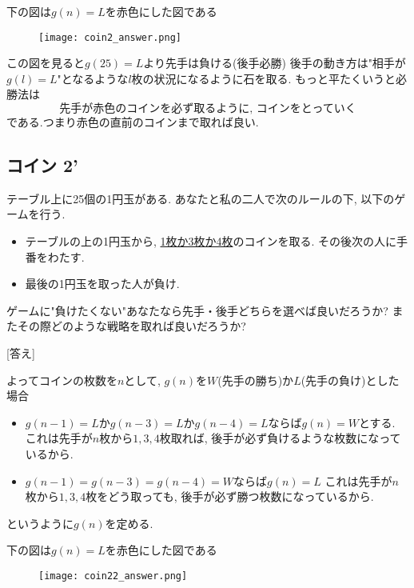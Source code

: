 \documentclass[dvipdfmx,a4paper,12pt]{article} %
\theoremstyle{definition}
\theoremstyle{remark}
\numberwithin{equation}{section}
\begin{document}
下の図は$g(n)=L$を赤色にした図である
\begin{figure}[htbp]
\begin{center}
\texttt{[image: coin2\_answer.png]}
\end{center}
\end{figure}

この図を見ると$g(25)=L$より先手は負ける(後手必勝)
後手の動き方は"相手が$g(l)=L$"となるような$l$枚の状況になるように石を取る. 
もっと平たくいうと必勝法は
$$
\text{先手が赤色のコインを必ず取るように, コインをとっていく}
$$
である.つまり赤色の直前のコインまで取れば良い. 


\subsection{コイン 2'}
\begin{tcolorbox}[mybox]
テーブル上に25個の1円玉がある.
あなたと私の二人で次のルールの下, 以下のゲームを行う.

\begin{itemize}
\item テーブルの上の1円玉から, \underline{1枚か3枚か4枚}のコインを取る. その後次の人に手番をわたす.
\item 最後の1円玉を取った人が負け.
\end{itemize}


ゲームに"負けたくない"あなたなら先手・後手どちらを選べば良いだろうか?
またその際どのような戦略を取れば良いだろうか?
\end{tcolorbox}

[答え]

よってコインの枚数を$n$として, $g(n)$を$W$(先手の勝ち)か$L$(先手の負け)とした場合
\begin{itemize}
\item $g(n-1)=L$か$g(n-3)=L$か$g(n-4)=L$ならば$g(n)=W$とする. 
これは先手が$n$枚から$1, 3, 4$枚取れば, 後手が必ず負けるような枚数になっているから.
\item $g(n-1)=g(n-3)=g(n-4)=W$ならば$g(n)=L$
これは先手が$n$枚から$1, 3, 4$枚をどう取っても, 後手が必ず勝つ枚数になっているから.
\end{itemize}
というように$g(n)$を定める.

下の図は$g(n)=L$を赤色にした図である
\begin{figure}[htbp]
\begin{center}
\texttt{[image: coin22\_answer.png]}
\end{center}
\end{figure}
\end{document}

